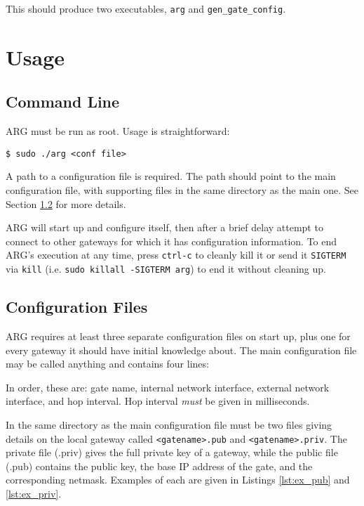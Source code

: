 \par This should produce two executables, \texttt{arg} and \texttt{gen\_gate\_config}.

\section{Usage}
\label{sec:arg_cmd}
\subsection{Command Line}
\par \ac{ARG} must be run as root. Usage is straightforward:
\begin{lstlisting}[numbers=none] 
$ sudo ./arg <conf file>
\end{lstlisting}

\par A path to a configuration file is required. The path should point to the main configuration file, with supporting files in the same directory as the main one. See Section \ref{sec:arg_conf_files} for more details.

\par \ac{ARG} will start up and configure itself, then after a brief delay attempt to connect to other gateways for which it has configuration information. To end \acs{ARG}'s execution at any time, press \texttt{ctrl-c} to cleanly kill it or send it \texttt{SIGTERM} via \texttt{kill} (i.e. \lstinline{sudo killall -SIGTERM arg}) to end it without cleaning up.

\subsection{Configuration Files}
\label{sec:arg_conf_files}
\par \ac{ARG} requires at least three separate configuration files on start up, plus one for every gateway it should have initial knowledge about. The main configuration file may be called anything and contains four lines:


\par In order, these are: gate name, internal network interface, external network interface, and hop interval. Hop interval \textit{must} be given in milliseconds.

\par In the same directory as the main configuration file must be two files giving details on the local gateway called \texttt{<gatename>.pub} and \texttt{<gatename>.priv}. The private file (.priv) gives the full private key of a gateway, while the public file (.pub) contains the public key, the base \ac{IP} address of the gate, and the corresponding netmask. Examples of each are given in Listings \ref{lst:ex_pub} and \ref{lst:ex_priv}.

